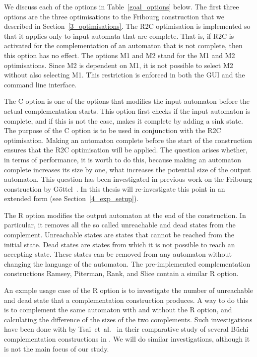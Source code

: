 We discuss each of the options in Table~\ref{goal_options} below. The first three options are the three optimisations to the Fribourg construction that we described in Section~\ref{3_optimisations}. The R2C optimisation is implemented so that it applies only to input automata that are complete. That is, if R2C is activated for the complementation of an automaton that is not complete, then this option has no effect. The options M1 and M2 stand for the M1 and M2 optimisations. Since M2 is dependent on M1, it is not possible to select M2 without also selecting M1. This restriction is enforced in both the GUI and the command line interface.

The C option is one of the options that modifies the input automaton before the actual complementation starts. This option first checks if the input automaton is complete, and if this is not the case, makes it complete by adding a sink state. The purpose of the C option is to be used in conjunction with the R2C optimisation. Making an automaton complete before the start of the construction ensures that the R2C optimisation will be applied. The question arises whether, in terms of performance, it is worth to do this, because making an automaton complete increases its size by one, what increases the potential size of the output automaton. This question has been investigated in previous work on the Fribourg construction by Göttel~\cite{2013_bsc_goettel}. In this thesis will re-investigate this point in an extended form (see Section~\ref{4_exp_setup}).

The R option modifies the output automaton at the end of the construction. In particular, it removes all the so called unreachable and dead states from the complement. Unreachable states are states that cannot be reached from the initial state. Dead states are states from which it is not possible to reach an accepting state. These states can be removed from any automaton without changing the language of the automaton. The pre-implemented complementation constructions Ramsey, Piterman, Rank, and Slice contain a similar R option.

An exmple usage case of the R option is to investigate the number of unreachable and dead state that a complementation construction produces. A way to do this is to complement the same automaton with and without the R option, and calculating the difference of the sizes of the two complements. Such investigations have been done with by Tsai~et~al.~\cite{2011_tsai} in their comparative study of several Büchi complementation constructions in \goal. We will do similar investigations, although it is not the main focus of our study.

